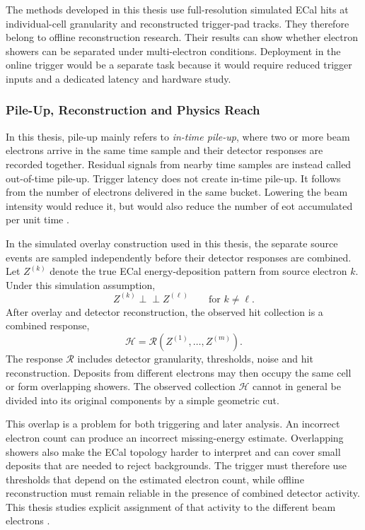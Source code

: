 The methods developed in this thesis use full-resolution simulated ECal hits
at individual-cell granularity and reconstructed trigger-pad tracks. They
therefore belong to offline reconstruction research. Their results can show
whether electron showers can be separated under multi-electron conditions.
Deployment in the online trigger would be a separate task because it would
require reduced trigger inputs and a dedicated latency and hardware study.

\subsubsection{Pile-Up, Reconstruction and Physics Reach}
\label{sec:formalism}

In this thesis, \gls{pile-up} mainly refers to \emph{in-time pile-up}, where
two or more beam electrons arrive in the same time sample and their detector
responses are recorded together. Residual signals from nearby time samples
are instead called out-of-time pile-up. Trigger latency does not create
in-time pile-up. It follows from the number of electrons delivered in the
same bucket. Lowering the beam intensity would reduce it, but would also
reduce the number of \gls{eot} accumulated per unit time
\cite{ldmx2025-overview}.

In the simulated overlay construction used in this thesis, the separate
source events are sampled independently before their detector responses are
combined. Let \(Z^{(k)}\) denote the true ECal energy-deposition pattern from
source electron \(k\). Under this simulation assumption,
\begin{equation}
    Z^{(k)} \perp\!\!\!\perp Z^{(\ell)}
    \qquad \text{for } k\neq\ell .
\end{equation}
After overlay and detector reconstruction, the observed hit collection is a
combined response,
\begin{equation}
    \mathcal{H}
    =
    \mathcal{R}\!\left(
        Z^{(1)},\ldots,Z^{(m)}
    \right).
\end{equation}
The response \(\mathcal{R}\) includes detector granularity, thresholds,
noise and hit reconstruction. Deposits from different electrons may then
occupy the same cell or form overlapping showers. The observed collection
\(\mathcal{H}\) cannot in general be divided into its original components by
a simple geometric cut.

This overlap is a problem for both triggering and later analysis. An
incorrect electron count can produce an incorrect missing-energy estimate.
Overlapping showers also make the ECal topology harder to interpret and can
cover small deposits that are needed to reject backgrounds. The trigger must
therefore use thresholds that depend on the estimated electron count, while
offline reconstruction must remain reliable in the presence of combined
detector activity. This thesis studies explicit assignment of that activity
to the different beam electrons \cite{ldmx2025-overview}.

